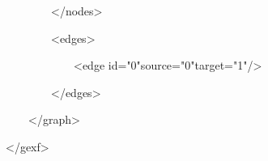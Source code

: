 {{}{\hlstd\ \ \ \ \ \ \ \ }{\hlstd }{\hlkwa $\mathord{<}$/nodes$\mathord{>}$}{\hlstd \leavevmode\par
}{\hlstd\ \ \ \ \ \ \ \ }{\hlstd }{\hlkwa $\mathord{<}$edges$\mathord{>}$}{\hlstd \leavevmode\par
}{\hlstd\ \ \ \ \ \ \ \ \ \ \ \ }{\hlstd }{\hlkwa $\mathord{<}$edge id$\mathord{=}$}{\hlstr "0"}{\hlkwa  source$\mathord{=}$}{\hlstr "0"}{\hlkwa  target$\mathord{=}$}{\hlstr "1"}{\hlkwa  /$\mathord{>}$}{\hlstd \leavevmode\par
}{\hlstd\ \ \ \ \ \ \ \ }{\hlstd }{\hlkwa $\mathord{<}$/edges$\mathord{>}$}{\hlstd \leavevmode\par
}{\hlstd\ \ \ \ }{\hlstd }{\hlkwa $\mathord{<}$/graph$\mathord{>}$}{\hlstd }\leavevmode\par
{\hlkwa $\mathord{<}$/gexf$\mathord{>}$}{\hlstd }\leavevmode\par
}
\bye
